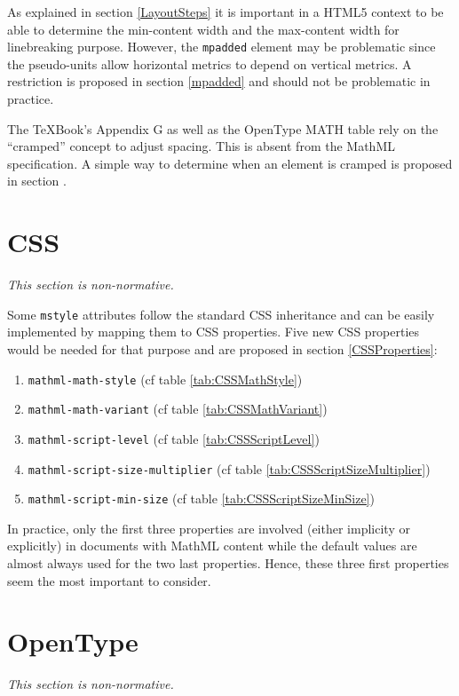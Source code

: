 As explained in section \ref{LayoutSteps} it is important in a
HTML5 context to be able to determine the min-content width and the max-content
width for linebreaking purpose. However, the {\tt mpadded} element may be
problematic since the pseudo-units allow horizontal metrics to depend on
vertical metrics. A restriction is proposed in section \ref{mpadded} and should
not be problematic in practice.

The \TeX Book's Appendix G as well as the OpenType MATH table rely on the
``cramped'' concept to adjust spacing. This is absent from the MathML
specification. A simple way to determine when an element is cramped is
proposed in section \label{LaTeX}.

\section{CSS}

{\em This section is non-normative.}

Some {\tt mstyle} attributes follow the standard CSS inheritance and can be
easily implemented by mapping them to CSS properties. Five new CSS properties
would be needed for that purpose and are proposed in section
\ref{CSSProperties}:

\begin{enumerate}
\item {\tt mathml-math-style} (cf table \ref{tab:CSSMathStyle})
\item {\tt mathml-math-variant} (cf table \ref{tab:CSSMathVariant})
\item {\tt mathml-script-level} (cf table \ref{tab:CSSScriptLevel})
\item {\tt mathml-script-size-multiplier} (cf table \ref{tab:CSSScriptSizeMultiplier})
\item {\tt mathml-script-min-size} (cf table \ref{tab:CSSScriptSizeMinSize})
\end{enumerate}

In practice, only the first three properties are involved (either implicity
or explicitly) in documents with MathML content while the default values are
almost always used for the two last properties. Hence, these three first
properties seem the most important to consider.

\section{OpenType}

{\em This section is non-normative.}

